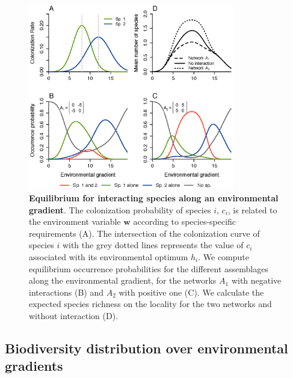 \begin{figure}[h!]
\centering
\includegraphics[width=0.8\textwidth]{./chapitre1/fig3.eps}
\caption[Equilibrium for interacting species along an environmental gradient]{\textbf{Equilibrium for interacting species along an environmental gradient}. The colonization probability of species $i$, $c_i$, is related to the environment variable $\mathbf{w}$ according to species-specific requirements (A). The intersection of the colonization curve of species $i$ with the grey dotted lines represents the value of $c_i$ associated with its environmental optimum $h_i$. We compute equilibrium occurrence probabilities for the different assemblages along the environmental gradient, for the networks $A_1$ with negative interactions (B) and $A_2$ with positive one (C). We calculate the expected species richness on the locality for the two networks and without interaction (D).
}
\label{chap1fig3}
\end{figure}



\subsection{Biodiversity distribution over environmental gradients}

